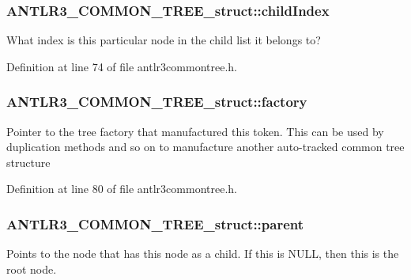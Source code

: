 \hypertarget{struct_a_n_t_l_r3___c_o_m_m_o_n___t_r_e_e__struct_afe231f9f4e1979f1765abdc677198ebf}{
\subsubsection[{child\-Index}]{ A\-N\-T\-L\-R3\-\_\-\-C\-O\-M\-M\-O\-N\-\_\-\-T\-R\-E\-E\-\_\-struct\-::child\-Index}}\label{struct_a_n_t_l_r3___c_o_m_m_o_n___t_r_e_e__struct_afe231f9f4e1979f1765abdc677198ebf}
What index is this particular node in the child list it belongs to? 

Definition at line 74 of file antlr3commontree.\-h.

\hypertarget{struct_a_n_t_l_r3___c_o_m_m_o_n___t_r_e_e__struct_ab2cba63bc8ae9fcd0916fa9c0903982a}{
\subsubsection[{factory}]{ A\-N\-T\-L\-R3\-\_\-\-C\-O\-M\-M\-O\-N\-\_\-\-T\-R\-E\-E\-\_\-struct\-::factory}}\label{struct_a_n_t_l_r3___c_o_m_m_o_n___t_r_e_e__struct_ab2cba63bc8ae9fcd0916fa9c0903982a}
Pointer to the tree factory that manufactured this token. This can be used by duplication methods and so on to manufacture another auto-\/tracked common tree structure 

Definition at line 80 of file antlr3commontree.\-h.

\hypertarget{struct_a_n_t_l_r3___c_o_m_m_o_n___t_r_e_e__struct_a0c48243a71441dd67cb307dc35dc49ab}{
\subsubsection[{parent}]{ A\-N\-T\-L\-R3\-\_\-\-C\-O\-M\-M\-O\-N\-\_\-\-T\-R\-E\-E\-\_\-struct\-::parent}}\label{struct_a_n_t_l_r3___c_o_m_m_o_n___t_r_e_e__struct_a0c48243a71441dd67cb307dc35dc49ab}
Points to the node that has this node as a child. If this is N\-U\-L\-L, then this is the root node. 

